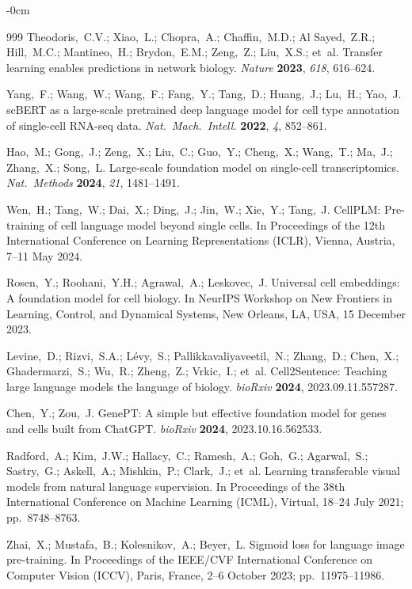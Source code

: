 \documentclass[biology,article,submit,pdftex,moreauthors]{Definitions/mdpi}
\begin{document}
\begin{adjustwidth}{-\extralength}{0cm}
\begin{thebibliography}{999}
Theodoris,~C.V.; Xiao,~L.; Chopra,~A.; Chaffin,~M.D.; Al Sayed,~Z.R.; Hill,~M.C.; Mantineo,~H.; Brydon,~E.M.; Zeng,~Z.; Liu,~X.S.; et~al. Transfer learning enables predictions in network biology. {\em Nature} {\bf 2023}, {\em 618}, 616--624.

Yang,~F.; Wang,~W.; Wang,~F.; Fang,~Y.; Tang,~D.; Huang,~J.; Lu,~H.; Yao,~J. scBERT as a large-scale pretrained deep language model for cell type annotation of single-cell RNA-seq data. {\em Nat.\ Mach.\ Intell.} {\bf 2022}, {\em 4}, 852--861.

Hao,~M.; Gong,~J.; Zeng,~X.; Liu,~C.; Guo,~Y.; Cheng,~X.; Wang,~T.; Ma,~J.; Zhang,~X.; Song,~L. Large-scale foundation model on single-cell transcriptomics. {\em Nat.\ Methods} {\bf 2024}, {\em 21}, 1481--1491.

Wen,~H.; Tang,~W.; Dai,~X.; Ding,~J.; Jin,~W.; Xie,~Y.; Tang,~J. CellPLM: Pre-training of cell language model beyond single cells. In Proceedings of the 12th International Conference on Learning Representations (ICLR), Vienna, Austria, 7--11 May 2024.

Rosen,~Y.; Roohani,~Y.H.; Agrawal,~A.; Leskovec,~J. Universal cell embeddings: A foundation model for cell biology. In NeurIPS Workshop on New Frontiers in Learning, Control, and Dynamical Systems, New Orleans, LA, USA, 15 December 2023.

Levine,~D.; Rizvi,~S.A.; L\'{e}vy,~S.; Pallikkavaliyaveetil,~N.; Zhang,~D.; Chen,~X.; Ghadermarzi,~S.; Wu,~R.; Zheng,~Z.; Vrkic,~I.; et~al. Cell2Sentence: Teaching large language models the language of biology. {\em bioRxiv} {\bf 2024}, 2023.09.11.557287.

Chen,~Y.; Zou,~J. GenePT: A simple but effective foundation model for genes and cells built from ChatGPT. {\em bioRxiv} {\bf 2024}, 2023.10.16.562533.

Radford,~A.; Kim,~J.W.; Hallacy,~C.; Ramesh,~A.; Goh,~G.; Agarwal,~S.; Sastry,~G.; Askell,~A.; Mishkin,~P.; Clark,~J.; et~al. Learning transferable visual models from natural language supervision. In Proceedings of the 38th International Conference on Machine Learning (ICML), Virtual, 18--24 July 2021; pp.\ 8748--8763.

Zhai,~X.; Mustafa,~B.; Kolesnikov,~A.; Beyer,~L. Sigmoid loss for language image pre-training. In Proceedings of the IEEE/CVF International Conference on Computer Vision (ICCV), Paris, France, 2--6 October 2023; pp.\ 11975--11986.


\end{thebibliography}
\end{adjustwidth}
\end{document}
